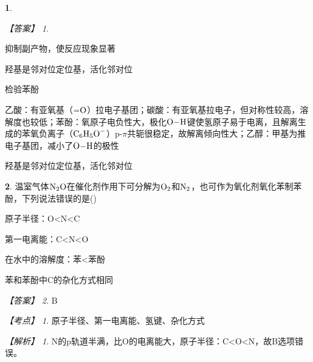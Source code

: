 \documentclass[UTF8, 10pt, a4paper, oneside]{ctexart}
\newcommand{\fs}[1]{{\fangsong #1}}%
\theoremstyle{definition}
\newtheorem{subexercise}{}[exercise]%
\theoremstyle{remark}
\newtheorem*{answer}{【答案】}
\newtheorem*{point}{【考点】}      %
\newtheorem*{explanation}{【解析】}     %
\theoremstyle{plain}
\begin{document}
\begin{subexercise}
\begin{answer}
\begin{inparaenum}
            \item 抑制副产物，使反应现象显著
            \item 羟基是邻对位定位基，活化邻对位
            \item 检验苯酚
            \item 乙酸：有亚氧基（$\ce{=O}$）拉电子基团；碳酸：有亚氧基拉电子，但对称性较高，溶解度也较低；苯酚：氧原子电负性大，极化$\ce{O-H}$键使氢原子易于电离，且解离生成的苯氧负离子（$\ce{C6H5O-}$）p-$\pi$共轭很稳定，故解离倾向性大；乙醇：甲基为推电子基团，减小了$\ce{O-H}$的极性
            \item 羟基是邻对位定位基，活化邻对位
        \end{inparaenum}
    \end{answer}
\end{subexercise}
\begin{subexercise}
    \fs{[2024甘肃卷]}温室气体$\ce{N2O}$在催化剂作用下可分解为$\ce{O2}$和$\ce{N2}$，也可作为氧化剂氧化苯制苯酚，下列说法错误的是\quad(\quad)
    \begin{adjustwidth}{4em}{}
            \begin{asparaenum}[A. ]
                \item 原子半径：O<N<C
                \item 第一电离能：C<N<O 
                \item 在水中的溶解度：苯<苯酚
                \item 苯和苯酚中C的杂化方式相同
            \end{asparaenum}
    \end{adjustwidth}
    \begin{answer}
        B
    \end{answer}
    \begin{point}
        原子半径、第一电离能、氢键、杂化方式
    \end{point}
    \begin{explanation}
        N的p轨道半满，比O的电离能大，原子半径：C<O<N，故B选项错误。
    \end{explanation}
\end{subexercise}
\end{document}
